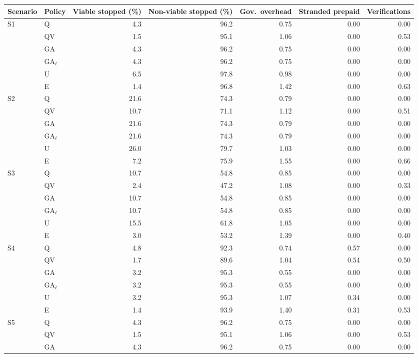 \begin{tabular}{@{}llrrrrr@{}}
\toprule
Scenario & Policy & Viable stopped (\%) & Non-viable stopped (\%) & Gov.\ overhead & Stranded prepaid & Verifications \\
\midrule
S1 & Q & 4.3 & 96.2 & 0.75 & 0.00 & 0.00 \\
 & QV & 1.5 & 95.1 & 1.06 & 0.00 & 0.53 \\
 & GA & 4.3 & 96.2 & 0.75 & 0.00 & 0.00 \\
 & GA$_\ell$ & 4.3 & 96.2 & 0.75 & 0.00 & 0.00 \\
 & U & 6.5 & 97.8 & 0.98 & 0.00 & 0.00 \\
 & E & 1.4 & 96.8 & 1.42 & 0.00 & 0.63 \\
\addlinespace[2pt]
S2 & Q & 21.6 & 74.3 & 0.79 & 0.00 & 0.00 \\
 & QV & 10.7 & 71.1 & 1.12 & 0.00 & 0.51 \\
 & GA & 21.6 & 74.3 & 0.79 & 0.00 & 0.00 \\
 & GA$_\ell$ & 21.6 & 74.3 & 0.79 & 0.00 & 0.00 \\
 & U & 26.0 & 79.7 & 1.03 & 0.00 & 0.00 \\
 & E & 7.2 & 75.9 & 1.55 & 0.00 & 0.66 \\
\addlinespace[2pt]
S3 & Q & 10.7 & 54.8 & 0.85 & 0.00 & 0.00 \\
 & QV & 2.4 & 47.2 & 1.08 & 0.00 & 0.33 \\
 & GA & 10.7 & 54.8 & 0.85 & 0.00 & 0.00 \\
 & GA$_\ell$ & 10.7 & 54.8 & 0.85 & 0.00 & 0.00 \\
 & U & 15.5 & 61.8 & 1.05 & 0.00 & 0.00 \\
 & E & 3.0 & 53.2 & 1.39 & 0.00 & 0.40 \\
\addlinespace[2pt]
S4 & Q & 4.8 & 92.3 & 0.74 & 0.57 & 0.00 \\
 & QV & 1.7 & 89.6 & 1.04 & 0.54 & 0.50 \\
 & GA & 3.2 & 95.3 & 0.55 & 0.00 & 0.00 \\
 & GA$_\ell$ & 3.2 & 95.3 & 0.55 & 0.00 & 0.00 \\
 & U & 3.2 & 95.3 & 1.07 & 0.34 & 0.00 \\
 & E & 1.4 & 93.9 & 1.40 & 0.31 & 0.53 \\
\addlinespace[2pt]
S5 & Q & 4.3 & 96.2 & 0.75 & 0.00 & 0.00 \\
 & QV & 1.5 & 95.1 & 1.06 & 0.00 & 0.53 \\
 & GA & 4.3 & 96.2 & 0.75 & 0.00 & 0.00 \\

\end{tabular}
